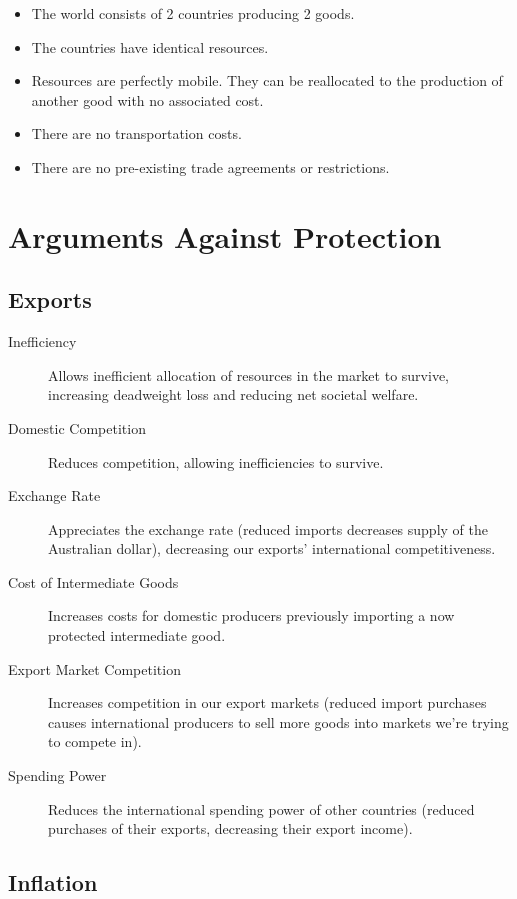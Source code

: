 \documentclass[a4paper,11pt]{article}
\begin{document}
\begin{itemize}
\item The world consists of 2 countries producing 2 goods.
\item The countries have identical resources.
\item Resources are perfectly mobile. They can be reallocated to the production
of another good with no associated cost.
\item There are no transportation costs.
\item There are no pre-existing trade agreements or restrictions.
\end{itemize}




\section{Arguments Against Protection}

\subsection{Exports}

\begin{description}
\item [Inefficiency] Allows inefficient allocation of resources in the market
	to survive, increasing deadweight loss and reducing net societal welfare.
\item [Domestic Competition] Reduces competition, allowing inefficiencies to
	survive.
\item [Exchange Rate] Appreciates the exchange rate (reduced imports decreases
	supply of the Australian dollar), decreasing our exports' international
	competitiveness.
\item [Cost of Intermediate Goods] Increases costs for domestic producers
	previously importing a now protected intermediate good.
\item [Export Market Competition] Increases competition in our export markets
	(reduced import purchases causes international producers to sell more goods
	into markets we're trying to compete in).
\item [Spending Power] Reduces the international spending power of other
	countries (reduced purchases of their exports, decreasing their export
	income).
\end{description}


\subsection{Inflation}
\end{document}
